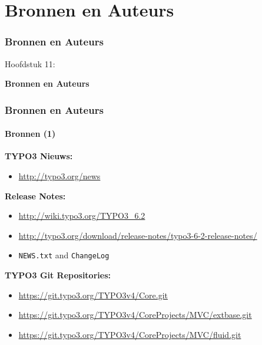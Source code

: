 %

\section{Bronnen en Auteurs}
\begin{frame}[fragile]
	\frametitle{Bronnen en Auteurs}

	\begin{center}\huge{Hoofdstuk 11:}\end{center}
	\begin{center}\huge{\color{typo3darkgrey}\textbf{Bronnen en Auteurs}}\end{center}

\end{frame}


\begin{frame}[fragile]
	\frametitle{Bronnen en Auteurs}
	\framesubtitle{Bronnen (1)}

	\textbf{TYPO3 Nieuws:}
		\begin{itemize}\smaller
			\item \url{http://typo3.org/news}
		\end{itemize}

	\textbf{Release Notes:}
		\begin{itemize}\smaller
			\item \url{http://wiki.typo3.org/TYPO3_6.2}
			\item \url{http://typo3.org/download/release-notes/typo3-6-2-release-notes/}
			\item \texttt{NEWS.txt} and \texttt{ChangeLog}
		\end{itemize}

	\textbf{TYPO3 Git Repositories:}
		\begin{itemize}\smaller
			\item \url{https://git.typo3.org/TYPO3v4/Core.git}
			\item \url{https://git.typo3.org/TYPO3v4/CoreProjects/MVC/extbase.git}
			\item \url{https://git.typo3.org/TYPO3v4/CoreProjects/MVC/fluid.git}
		\end{itemize}

\end{frame}

